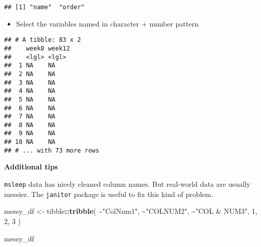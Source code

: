 \documentclass[
]{book}
\newenvironment{Shaded}{\begin{snugshade}}{\end{snugshade}}
\newcommand{\DecValTok}[1]{\textcolor[rgb]{0.00,0.00,0.81}{#1}}
\newcommand{\KeywordTok}[1]{\textcolor[rgb]{0.13,0.29,0.53}{\textbf{#1}}}
\newcommand{\NormalTok}[1]{#1}
\newcommand{\OperatorTok}[1]{\textcolor[rgb]{0.81,0.36,0.00}{\textbf{#1}}}
\newcommand{\OtherTok}[1]{\textcolor[rgb]{0.56,0.35,0.01}{#1}}
\newcommand{\StringTok}[1]{\textcolor[rgb]{0.31,0.60,0.02}{#1}}
\providecommand{\tightlist}{%
  \setlength{\itemsep}{0pt}\setlength{\parskip}{0pt}}
\begin{document}
\begin{verbatim}
## [1] "name"  "order"
\end{verbatim}

\begin{itemize}
\tightlist
\item
  Select the variables named in character + number pattern
\end{itemize}

\begin{Shaded}
\end{Shaded}

\begin{verbatim}
## # A tibble: 83 x 2
##    week8 week12
##    <lgl> <lgl> 
##  1 NA    NA    
##  2 NA    NA    
##  3 NA    NA    
##  4 NA    NA    
##  5 NA    NA    
##  6 NA    NA    
##  7 NA    NA    
##  8 NA    NA    
##  9 NA    NA    
## 10 NA    NA    
## # ... with 73 more rows
\end{verbatim}

\textbf{Additional tips}

\texttt{msleep} data has nicely cleaned column names. But real-world data are usually messier. The \texttt{janitor} package is useful to fix this kind of problem.

\begin{Shaded}
\begin{Highlighting}[]
\NormalTok{messy\_df \textless{}{-}}\StringTok{ }\NormalTok{tibble}\OperatorTok{::}\KeywordTok{tribble}\NormalTok{(}
  \OperatorTok{\textasciitilde{}}\StringTok{"ColNum1"}\NormalTok{, }\OperatorTok{\textasciitilde{}}\StringTok{"COLNUM2"}\NormalTok{, }\OperatorTok{\textasciitilde{}}\StringTok{"COL \& NUM3"}\NormalTok{,}
  \DecValTok{1}\NormalTok{, }\DecValTok{2}\NormalTok{, }\DecValTok{3}
\NormalTok{)}

\NormalTok{messy\_df}
\end{Highlighting}
\end{Shaded}
\end{document}
